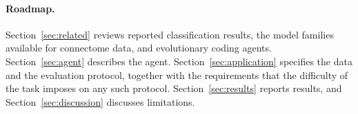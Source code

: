 \paragraph{Roadmap.}
Section~\ref{sec:related} reviews reported classification results, the model families available for
connectome data, and evolutionary coding agents. Section~\ref{sec:agent} describes the agent.
Section~\ref{sec:application} specifies the data and the evaluation protocol, together with the
requirements that the difficulty of the task imposes on any such protocol.
Section~\ref{sec:results} reports results, and Section~\ref{sec:discussion} discusses limitations.
